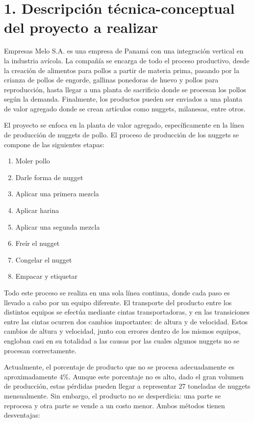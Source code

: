 \documentclass[
11pt, %
]{charter}
\begin{document}
\section{1. Descripción técnica-conceptual del proyecto a realizar}
\label{sec:descripcion}

Empresas Melo S.A. es una empresa de Panamá con una integración vertical en la industria avícola. La compañía se encarga de todo el proceso productivo, desde la creación de alimentos para pollos a partir de materia prima, pasando por la crianza de pollos de engorde, gallinas ponedoras de huevo y pollos para reproducción, hasta llegar a una planta de sacrificio donde se procesan los pollos según la demanda. Finalmente, los productos pueden ser enviados a una planta de valor agregado donde se crean artículos como nuggets, milanesas, entre otros.

El proyecto se enfoca en la planta de valor agregado, específicamente en la línea de producción de nuggets de pollo. El proceso de producción de los nuggets se compone de las siguientes etapas:

\begin{enumerate}
	\item Moler pollo
	\item Darle forma de nugget
	\item Aplicar una primera mezcla
	\item Aplicar harina
	\item Aplicar una segunda mezcla
	\item Freír el nugget
	\item Congelar el nugget
	\item Empacar y etiquetar	
\end{enumerate}

Todo este proceso se realiza en una sola línea continua, donde cada paso es llevado a cabo por un equipo diferente. El transporte del producto entre los distintos equipos se efectúa mediante cintas transportadoras, y en las transiciones entre las cintas ocurren dos cambios importantes: de altura y de velocidad. Estos cambios de altura y velocidad, junto con errores dentro de los mismos equipos, engloban casi en su totalidad a las causas por las cuales algunos nuggets no se procesan correctamente. 

Actualmente, el porcentaje de producto que no se procesa adecuadamente es aproximadamente  4\%. Aunque este porcentaje no es alto, dado el gran volumen de producción, estas pérdidas pueden llegar a representar 27 toneladas de nuggets mensualmente. Sin embargo, el producto no se desperdicia: una parte se reprocesa y otra parte se vende a un costo menor. Ambos métodos tienen desventajas:
\end{document}

